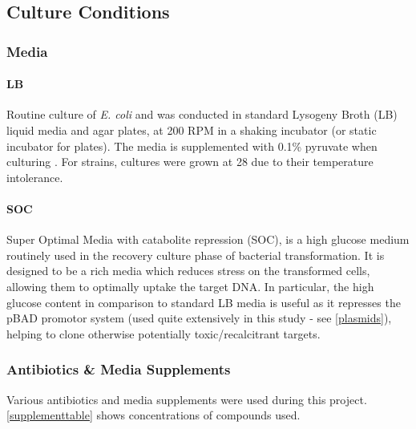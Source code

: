 \subsection{Culture Conditions}
	\subsubsection{Media}
		\paragraph{LB}
		Routine culture of \emph{E. coli} and \Pa{} was conducted in standard Lysogeny Broth (LB) liquid media and agar plates, at 200 RPM in a shaking incubator (or static incubator for plates). The media is supplemented with 0.1\% pyruvate when culturing \Pa. For \Plum{} strains, cultures were grown at 28\degC{} due to their temperature intolerance.
		\paragraph{SOC}
		Super Optimal Media with catabolite repression (SOC), is a high glucose medium routinely used in the recovery culture phase of bacterial transformation. It is designed to be a rich media which reduces stress on the transformed cells, allowing them to optimally uptake the target DNA. In particular, the high glucose content in comparison to standard LB media is useful as it represses the pBAD promotor system (used quite extensively in this study - see \vref{plasmids}), helping to clone otherwise potentially toxic/recalcitrant targets.

	\subsubsection{Antibiotics \& Media Supplements}\label{Antibiotics}
	Various antibiotics and media supplements were used during this project. \vref{supplementtable} shows concentrations of compounds used.
	
